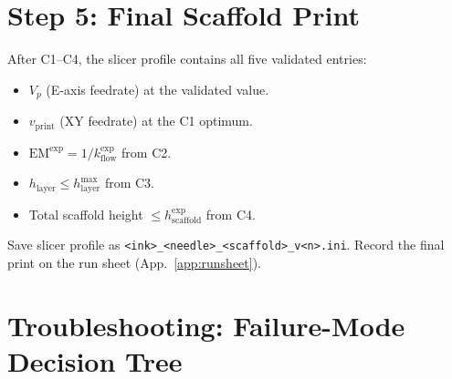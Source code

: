 \documentclass[11pt,a4paper]{article}
\begin{document}
\section{Step 5: Final Scaffold Print}
\label{sec:final}

After C1--C4, the slicer profile contains all five validated entries:
\begin{itemize}[leftmargin=1.4em,itemsep=2pt]
\item $V_p$ (E-axis feedrate) at the validated value.
\item $v_\mathrm{print}$ (XY feedrate) at the C1 optimum.
\item $\mathrm{EM}^\mathrm{exp}=1/k_\mathrm{flow}^\mathrm{exp}$ from C2.
\item $h_\mathrm{layer}\leq h_\mathrm{layer}^{\max}$ from C3.
\item Total scaffold height $\leq h_\mathrm{scaffold}^\mathrm{exp}$ from C4.
\end{itemize}

Save slicer profile as \texttt{<ink>\_<needle>\_<scaffold>\_v<n>.ini}.
Record the final print on the run sheet (App.~\ref{app:runsheet}).

\section{Troubleshooting: Failure-Mode Decision Tree}
\label{sec:troubleshoot}
\end{document}
